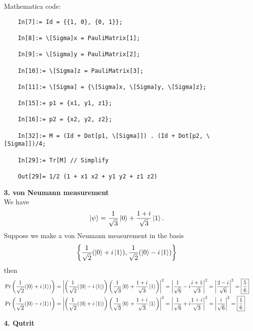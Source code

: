 \documentclass{article}
\theoremstyle{definition}
\newcommand{\f}[2]{\frac{#1}{#2}}
\newcommand{\lp}{\left(}
\newcommand{\rp}{\right)}
\newcommand{\lc}{\left\{}
\newcommand{\rc}{\right\}}
\begin{document}
\begin{enumerate}[label=(\alph*)]
	
	
	


Mathematica code:
\begin{lstlisting}
	In[7]:= Id = {{1, 0}, {0, 1}};
	
	In[8]:= \[Sigma]x = PauliMatrix[1];
	
	In[9]:= \[Sigma]y = PauliMatrix[2];
	
	In[10]:= \[Sigma]z = PauliMatrix[3];
	
	In[11]:= \[Sigma] = {\[Sigma]x, \[Sigma]y, \[Sigma]z};
	
	In[15]:= p1 = {x1, y1, z1};
	
	In[16]:= p2 = {x2, y2, z2};
	
	In[32]:= M = (Id + Dot[p1, \[Sigma]]) . (Id + Dot[p2, \[Sigma]])/4;
	
	In[29]:= Tr[M] // Simplify
	
	Out[29]= 1/2 (1 + x1 x2 + y1 y2 + z1 z2)
\end{lstlisting}
\end{enumerate}


\noindent \textbf{3. \textbf{von Neumann measurement}}\\

\noindent We have 
\begin{align*}
	\ket{\psi} = \f{1}{\sqrt{3}} \ket{0} + \f{1+i}{\sqrt{3}} \ket{1}.
\end{align*} 
Suppose we make a von Neumann measurement in the basis 
\begin{align*}
	\lc \f{1}{\sqrt{2}} (\ket{0} + i\ket{1}), \f{1}{\sqrt{2}} (\ket{0} - i\ket{1})     \rc
\end{align*}
then
\begin{align*}
	&\Pr\lp  \f{1}{\sqrt{2}} (\ket{0} + i\ket{1}) \rp = \abs{\lp \f{1}{\sqrt{2}} (\bra{0} - i\bra{1}) \rp \lp \f{1}{\sqrt{3}} \ket{0} + \f{1+i}{\sqrt{3}} \ket{1} \rp }^2 = \abs{\f{1}{\sqrt{6}} - i \f{i+1}{\sqrt{3}}}^2 = \abs{\f{2-i}{\sqrt{6}}}^2 = \boxed{\f{5}{6}}\\
	&\Pr\lp \f{1}{\sqrt{2}} (\ket{0} - i\ket{1})  \rp = \abs{\lp \f{1}{\sqrt{2}} (\bra{0} + i\bra{1}) \rp\lp \f{1}{\sqrt{3}} \ket{0} + \f{1+i}{\sqrt{3}} \ket{1} \rp}^2 = \abs{\f{1}{\sqrt{6}} + i \f{1+i}{\sqrt{3}}}^2 = \abs{\f{i}{\sqrt{6}}}^2 = \boxed{\f{1}{6}} 
\end{align*}




\noindent \textbf{4. Qutrit}
\end{document}
